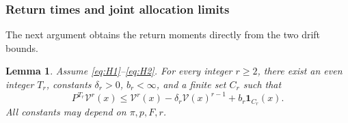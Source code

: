 \documentclass[12pt,a4paper]{article}
\newtheorem{lemma}{Lemma}
\theoremstyle{definition}
\theoremstyle{remark}\newtheorem{remark}{Remark}
\numberwithin{equation}{section}
\newcommand{\one}{\mathbf1}
\begin{document}
\subsubsection{Return times and joint allocation limits}\label{sec:stability}\label{sec:clt}
The next argument obtains the return moments directly from the two drift bounds.

\begin{lemma}\label{lem:polynomial}
Assume \eqref{eq:H1}--\eqref{eq:H2}. For every integer $r\ge2$, there exist an even integer $T_r$, constants $\delta_r>0$, $b_r<\infty$, and a finite set $C_r$ such that
\begin{equation}\label{eq:polynomial}
 P^{T_r}\mathcal V^r(x)\le \mathcal V^r(x)-\delta_r\mathcal V(x)^{r-1}+b_r\one_{C_r}(x).
\end{equation}
All constants may depend on $\pi,p,F,r$.
\end{lemma}
\end{document}
